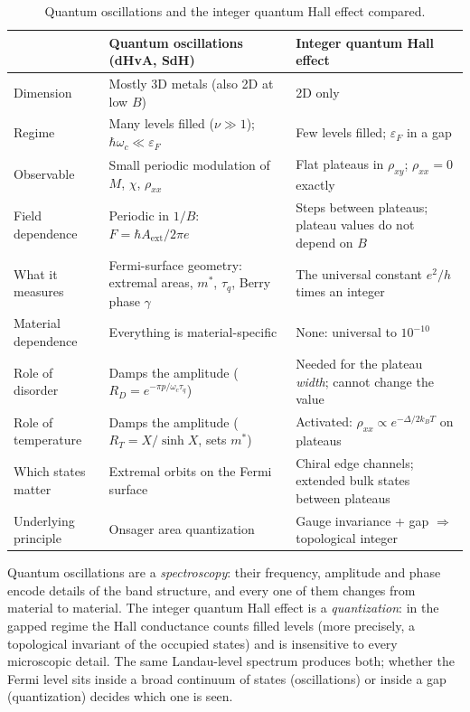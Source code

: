 \begin{table}[ht]
\centering
\small
\renewcommand{\arraystretch}{1.25}
\begin{tabular}{p{2.8cm}p{5.4cm}p{5.4cm}}
    \toprule
    & \textbf{Quantum oscillations (dHvA, SdH)} & \textbf{Integer quantum Hall effect}\\
    \midrule
    Dimension & Mostly 3D metals (also 2D at low $B$) & 2D only\\
    Regime & Many levels filled ($\nu\gg1$); $\hbar\omega_c\ll\varepsilon_F$ & Few levels filled; $\varepsilon_F$ in a gap\\
    Observable & Small periodic modulation of $M$, $\chi$, $\rho_{xx}$ & Flat plateaus in $\rho_{xy}$; $\rho_{xx} = 0$ exactly\\
    Field dependence & Periodic in $1/B$: $F = \hbar A_{\text{ext}}/2\pi e$ & Steps between plateaus; plateau values do not depend on $B$\\
    What it measures & Fermi-surface geometry: extremal areas, $m^*$, $\tau_q$, Berry phase $\gamma$ & The universal constant $e^2/h$ times an integer\\
    Material dependence & Everything is material-specific & None: universal to $10^{-10}$\\
    Role of disorder & Damps the amplitude ($R_D = e^{-\pi p/\omega_c\tau_q}$) & Needed for the plateau \emph{width}; cannot change the value\\
    Role of temperature & Damps the amplitude ($R_T = X/\sinh X$, sets $m^*$) & Activated: $\rho_{xx}\propto e^{-\Delta/2k_BT}$ on plateaus\\
    Which states matter & Extremal orbits on the Fermi surface & Chiral edge channels; extended bulk states between plateaus\\
    Underlying principle & Onsager area quantization & Gauge invariance + gap $\Rightarrow$ topological integer\\
    \bottomrule
\end{tabular}
\caption{Quantum oscillations and the integer quantum Hall effect compared.}
\label{tab:qhe-vs-qo}
\end{table}

\begin{fact}
Quantum oscillations are a \emph{spectroscopy}: their frequency, amplitude and phase encode details of the band structure, and every one of them changes from material to material. The integer quantum Hall effect is a \emph{quantization}: in the gapped regime the Hall conductance counts filled levels (more precisely, a topological invariant of the occupied states) and is insensitive to every microscopic detail. The same Landau-level spectrum produces both; whether the Fermi level sits inside a broad continuum of states (oscillations) or inside a gap (quantization) decides which one is seen.
\end{fact}

